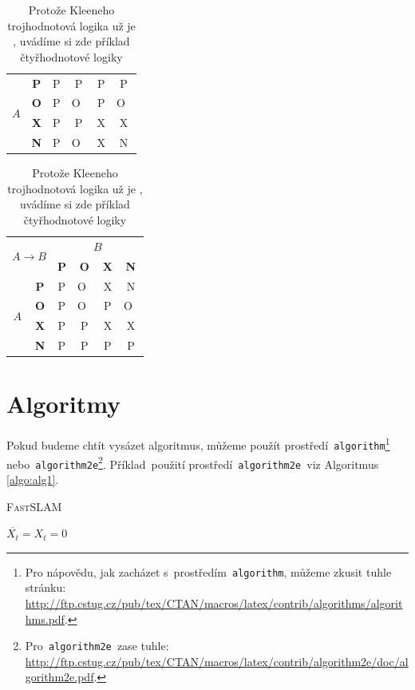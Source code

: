 \documentclass[11pt, a4paper]{article}
\def \noteB {Pro nápovědu, jak zacházet s~prostředím\texttt{ algorithm}, můžeme zkusit tuhle stránku:\\
\urlstyle{rm}\url{http://ftp.cstug.cz/pub/tex/CTAN/macros/latex/contrib/algorithms/algorithms.pdf}.}
\def \noteC {Pro\texttt{ algorithm2e }zase tuhle:
\urlstyle{rm}\url{http://ftp.cstug.cz/pub/tex/CTAN/macros/latex/contrib/algorithm2e/doc/algorithm2e.pdf}.}
\begin{document}
\begin{table}[h!]
\begin{tabular}{|c|c|c|c|c|c|}
        \multirow{4}{*}{$A$} & \textbf{P} & P & P & P & P \\ \cline{2-6} 
                             & \textbf{O} & P & O~& P & O~\\ \cline{2-6} 
                             & \textbf{X} & P & P & X & X \\ \cline{2-6} 
                             & \textbf{N} & P & O~& X & N \\ \hline
    \end{tabular}
    \begin{tabular}{|c|c|c|c|c|c|}\hline
        \multicolumn{2}{|c|}{\multirow{2}{*}{$A \to B$}} & \multicolumn{4}{c|}{$B$}\\ \cline{3-6} 
        \multicolumn{2}{|c|}{} & \textbf{P} & \textbf{O} & \textbf{X} & \textbf{N} \\ \hline
        \multirow{4}{*}{$A$} & \textbf{P} & P & O~& X & N \\ \cline{2-6} 
                             & \textbf{O} & P & O~& P & O~\\ \cline{2-6} 
                             & \textbf{X} & P & P & X & X \\ \cline{2-6} 
                             & \textbf{N} & P & P & P & P \\ \hline
    \end{tabular}
    
    
    \caption{Protože Kleeneho trojhodnotová logika už je , uvádíme si zde příklad čtyřhodnotové logiky} \label{tab:logika}
\end{table}

\pagebreak

\section{Algoritmy} \label{algo}
Pokud budeme chtít vysázet algoritmus, můžeme použít prostředí\verb| algorithm|\footnote{\noteB} nebo\verb| algorithm2e|\footnote{\noteC}. Příklad~použití prostředí\verb| algorithm2e |viz Algoritmus \ref{algo:alg1}.
\vspace{2em}

\begin{algorithm}[H]
    \label{algo:alg1}
    \caption{\textsc{FastSLAM}}
    \DontPrintSemicolon
    \SetAlgoNoLine
    \SetNlSkip{-1em}
    \BlankLine
\Indp\Indpp
$ \overline{X_t} = X_t = 0 $ \\
\end{algorithm}
\end{document}
